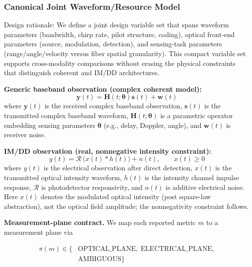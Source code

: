 \documentclass[letterpaper,journal]{IEEEtran}
\begin{document}
\subsubsection{Canonical Joint Waveform/Resource Model}
Design rationale: We define a joint design variable set that spans waveform parameters (bandwidth, chirp rate, pilot structure, coding), optical front-end parameters (source, modulation, detection), and sensing-task parameters (range/angle/velocity versus fiber spatial granularity). This compact variable set supports cross-modality comparisons without erasing the physical constraints that distinguish coherent and IM/DD architectures.


\textbf{Generic baseband observation (complex coherent model):}
\begin{equation}
    \mathbf{y}(t)=\mathbf{H}(t;\boldsymbol{\theta})\mathbf{s}(t)+\mathbf{w}(t)
\end{equation}
where \(\mathbf{y}(t)\) is the received complex baseband observation, \(\mathbf{s}(t)\) is the transmitted complex baseband waveform, \(\mathbf{H}(t;\boldsymbol{\theta})\) is a parametric operator embedding sensing parameters \(\boldsymbol{\theta}\) (e.g., delay, Doppler, angle), and \(\mathbf{w}(t)\) is receiver noise.

\textbf{IM/DD observation (real, nonnegative intensity constraint):}
\begin{equation}
    y(t)=\mathcal{R}\,\big(x(t)\ast h(t)\big)+n(t),\qquad x(t)\ge 0
\end{equation}
where \(y(t)\) is the electrical observation after direct detection, \(x(t)\) is the transmitted optical intensity waveform, \(h(t)\) is the intensity channel impulse response, \(\mathcal{R}\) is photodetector responsivity, and \(n(t)\) is additive electrical noise. Here \(x(t)\) denotes the modulated optical intensity (post square-law abstraction), not the optical field amplitude; the nonnegativity constraint follows.

\textbf{Measurement-plane contract.} We map each reported metric \(m\) to a measurement plane via

\begin{equation}
    \label{eq:measurement_plane_contract}
    \begin{aligned}
        \pi(m)\in\{ & \text{OPTICAL\_PLANE},\;\text{ELECTRICAL\_PLANE}, \\
                    & \text{AMBIGUOUS}\}
    \end{aligned}
\end{equation}
\end{document}
